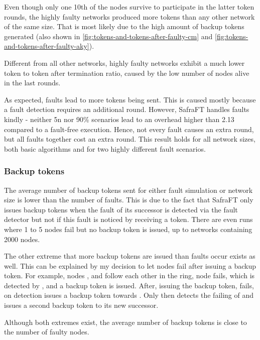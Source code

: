 Even though only one 10th of the nodes survive to participate in the latter token rounds, the highly faulty networks produced more tokens than any other network of the same size.
That is most likely due to the high amount of backup tokens generated (also shown in \cref{fig:tokens-and-tokens-after-faulty-cm} and \ref{fig:tokens-and-tokens-after-faulty-aky}).

Different from all other networks, highly faulty networks exhibit a much lower token to token after termination ratio, caused by the low number of nodes alive in the last rounds.

As expected, faults lead to more tokens being sent.
This is caused mostly because a fault detection requires an additional round.
However, SafraFT handles faults kindly - neither 5n nor 90\% scenarios lead to an overhead higher than 2.13 compared to a fault-free execution.
Hence, not every fault causes an extra round, but all faults together cost an extra round.
This result holds for all network sizes, both basic algorithms and for two highly different fault scenarios.

\subsubsection{Backup tokens}
The average number of backup tokens sent for either fault simulation or network size is lower than the number of faults.
This is due to the fact that SafraFT only issues backup tokens when the fault of its successor is detected via the fault detector but not if this fault is noticed by receiving a token.
There are even runs where 1 to 5 nodes fail but no backup token is issued, up to networks containing 2000 nodes.

The other extreme that more backup tokens are issued than faults occur exists as well.
This can be explained by my decision to let nodes fail after issuing a backup token.
For example, nodes ,  and  follow each other in the ring, node  fails, which is detected by , and a backup token is issued.
After, issuing the backup token,  fails, on detection  issues a backup token towards .
Only then  detects the failing of  and issues a second backup token to its new successor.

Although both extremes exist, the average number of backup tokens is close to the number of faulty nodes.

